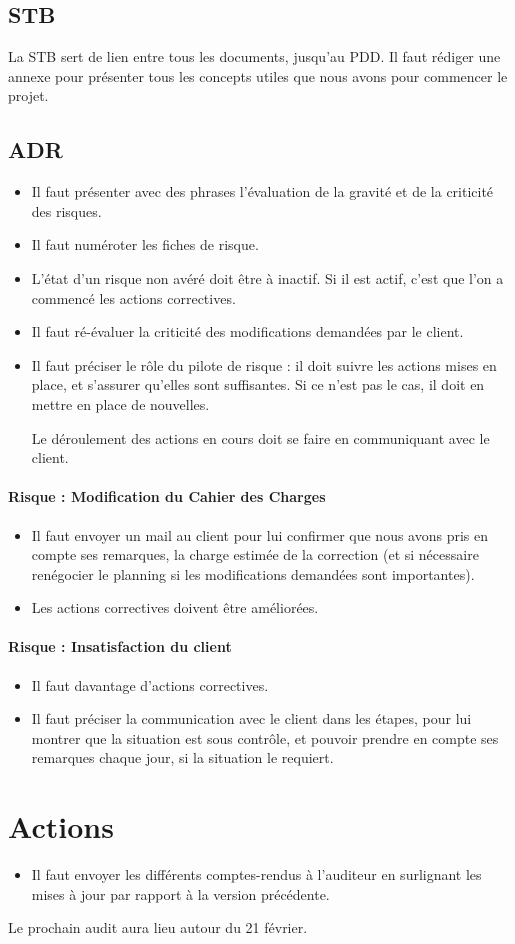 \documentclass[a4paper,11pt,french]{article}
\begin{document}
\subsection{STB}
La STB sert de lien entre tous les documents, jusqu'au PDD.
Il faut rédiger une annexe pour présenter tous les concepts utiles que nous avons pour commencer le projet.

\subsection{ADR}
\begin{itemize}
\item Il faut présenter avec des phrases l'évaluation de la gravité et de la criticité des risques.
\item Il faut numéroter les fiches de risque.
\item L'état d'un risque non avéré doit être à inactif. Si il est actif, c'est que l'on a commencé les actions correctives.
\item Il faut ré-évaluer la criticité des modifications demandées par le client.
\item Il faut préciser le rôle du pilote de risque : il doit suivre les actions mises en place, et s'assurer qu'elles sont suffisantes. Si ce n'est pas le cas, il doit en mettre en place de nouvelles.

Le déroulement des actions en cours doit se faire en communiquant avec le client.
\end{itemize}

\paragraph{Risque  : Modification du Cahier des Charges}
\begin{itemize}
\item Il faut envoyer un mail au client pour lui confirmer que nous avons pris en compte ses remarques, la charge estimée de la correction (et si nécessaire renégocier le planning si les modifications demandées sont importantes).
\item Les actions correctives doivent être améliorées.
\end{itemize}

\paragraph{Risque  : Insatisfaction du client}
\begin{itemize}
\item Il faut davantage d'actions correctives.
\item Il faut préciser la communication avec le client dans les étapes, pour lui montrer que la situation est sous contrôle, et pouvoir prendre en compte ses remarques chaque jour, si la situation le requiert.
\end{itemize}

\section{Actions}
\begin{itemize}
\item Il faut envoyer les différents comptes-rendus à l'auditeur en surlignant les mises à jour par rapport à la version précédente.
\end{itemize}

Le prochain audit aura lieu autour du 21 février.
\end{document}
